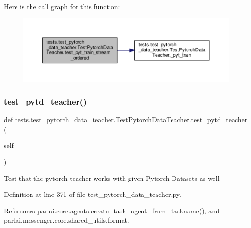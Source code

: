 Here is the call graph for this function\+:
\nopagebreak
\begin{figure}[H]
\begin{center}
\leavevmode
\includegraphics[width=350pt]{classtests_1_1test__pytorch__data__teacher_1_1TestPytorchDataTeacher_a1ccb0839b1de7c220c5b53e73d4f9ae1_cgraph}
\end{center}
\end{figure}
\mbox{\label{classtests_1_1test__pytorch__data__teacher_1_1TestPytorchDataTeacher_a3ff18909bd05956b4fa7970bc3c96afb}} 
\subsubsection{\texorpdfstring{test\+\_\+pytd\+\_\+teacher()}{test\_pytd\_teacher()}}
{\footnotesize\ttfamily def tests.\+test\+\_\+pytorch\+\_\+data\+\_\+teacher.\+Test\+Pytorch\+Data\+Teacher.\+test\+\_\+pytd\+\_\+teacher (\begin{DoxyParamCaption}\item[{}]{self }\end{DoxyParamCaption})}

\begin{DoxyVerb}Test that the pytorch teacher works with given Pytorch Datasets
as well
\end{DoxyVerb}
 

Definition at line 371 of file test\+\_\+pytorch\+\_\+data\+\_\+teacher.\+py.



References parlai.\+core.\+agents.\+create\+\_\+task\+\_\+agent\+\_\+from\+\_\+taskname(), and parlai.\+messenger.\+core.\+shared\+\_\+utils.\+format.

